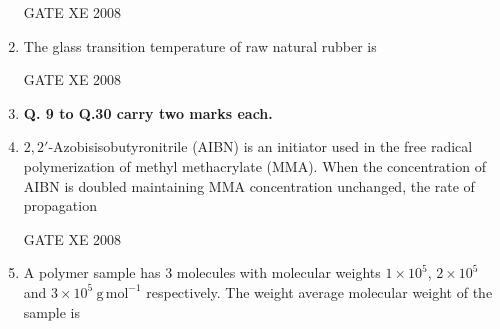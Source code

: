 \documentclass[12pt]{article}
\begin{document}
\begin{enumerate}[label=Q\arabic*.]
 GATE XE 2008

\item The glass transition temperature of raw natural rubber is  

\begin{enumerate}[label=(\Alph*)]
\end{enumerate}

GATE XE 2008

\item[] \textbf{Q. 9 to Q.30 carry two marks each.}


\item $2,2'$-Azobisisobutyronitrile (AIBN) is an initiator used in the free radical polymerization of methyl methacrylate (MMA). When the concentration of AIBN is doubled maintaining MMA concentration unchanged, the rate of propagation  

\begin{enumerate}[label=(\Alph*)]
\end{enumerate}

GATE XE 2008

\item A polymer sample has $3$ molecules with molecular weights $1\times 10^5$, $2\times 10^5$ and $3\times 10^5~\mathrm{g\,mol^{-1}}$ respectively. The weight average molecular weight of the sample is  

\begin{enumerate}[label=(\Alph*)]
\end{enumerate}


\end{enumerate}
\end{document}
